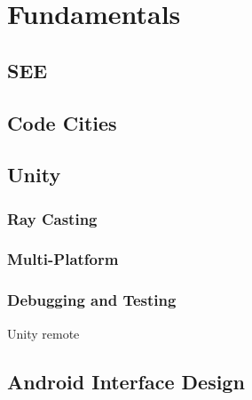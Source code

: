 \section{Fundamentals}
\label{sec:fundamentals}

\subsection{SEE}
\subsection{Code Cities}
\subsection{Unity}
\subsubsection{Ray Casting}
\subsubsection{Multi-Platform}
\subsubsection{Debugging and Testing}
Unity remote
\subsection{Android Interface Design}
